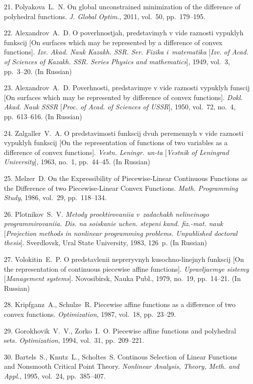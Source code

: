 {21. Polyakova~L.~N. On global unconstrained minimization of the
difference of polyhedral functions. \textit{J. Global Optim.},
2011, vol.~50, pp.~179--195.

22. Alexandrov~A.~D. O poverhnostjah, predstavimyh v vide raznosti
vypuklyh funkscij [On surfaces which may be represented by a
difference of convex functions]. \textit{Izv. Akad. Nauk Kazakh.
SSR. Ser. Fizika i~matematika} [\textit{Izv. of Acad. of Sciences
of Kazakh. SSR. Series Physics and mathematics}], 1949, vol.~3,
pp.~3--20. (In Russian)

23. Alexandrov~A.~D. Poverhnosti, predstavimye v vide raznosti
vypuklyh funscij [On surfaces which may be represented by
difference of convex functions]. \textit{Dokl. Akad. Nauk SSSR}
[\textit{Proc. of Acad. of Sciences of USSR}], 1950, vol.~72,
no.~4, pp.~613--616. (In Russian)

24. Zalgaller~V.~A. O predstavimosti funkscij dvuh peremennyh v
vide raznosti vypuklyh funkscij [On the representation of
functions of two variables as a difference of convex functions].
\textit{Vestn. Leningr. un-ta}  [\textit{Vestnik of Leningrad
University}], 1963, no.~1, pp.~44--45. (In Russian)

25. Melzer~D. On the Expressibility of Piecewise-Linear Continuous
Functions as the Difference of two Piecewise-Linear Convex
Functions. \textit{Math.  Programming Study}, 1986, vol.~29,
pp.~118--134.

26.    Plotnikov~S.~V.     \textit{Metody proektirovaniia
v~zadachakh nelineinogo programmirovaniia. Dis. na soiskanie
uchen. stepeni kand. fiz.-mat. nauk}     [\textit{Projection
methods in nonlinear programming problems.     Unpublished
doctoral thesis}].     Sverdlovsk,     Ural State University,
1983, 126~p. (In Russian)

27. Volokitin~E.~P. O predstavlenii nepreryvnyh kusochno-linejnyh
funkscij [On the representation of continuous piecewise affine
functions]. \textit{Upravljaemye sistemy} [\textit{Management
systems}]. Novosibirsk, Nauka Publ., 1979, no.~19, pp.~14--21. (In
Russian)

28. Kripfganz~A., Schulze~R. Piecewise affine functions as a
difference of two convex functions. \textit{Optimization}, 1987,
vol.~18,  pp.~23--29.

29. Gorokhovik~V.~V., Zorko~I.~O. Piecewise affine functions and
polyhedral sets. \textit{Optimization}, 1994, vol.~31,
pp.~209--221.

30. Bartels~S., Knutz~L., Scholtes~S. Continous Selection of
Linear Functions and Nonsmooth Critical Point Theory.
\textit{Nonlinear Analysis, Theory, Meth. and Appl.}, 1995,
vol.~24, pp.~385--407.

}
